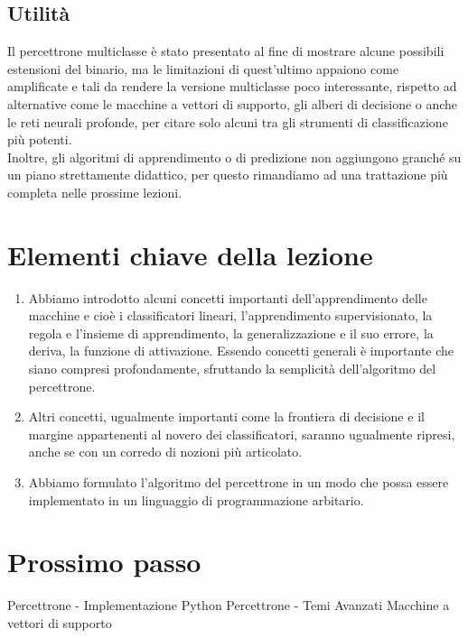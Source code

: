 \documentclass[
  letterpaper,
  DIV=11,
  numbers=noendperiod]{scrreprt}
\providecommand{\tightlist}{%
  \setlength{\itemsep}{0pt}\setlength{\parskip}{0pt}}\usepackage{longtable,booktabs,array}
\begin{document}
\subsection{Utilità}\label{utilituxe0}

Il percettrone multiclasse è stato presentato al fine di mostrare alcune
possibili estensioni del binario, ma le limitazioni di quest'ultimo
appaiono come amplificate e tali da rendere la versione multiclasse poco
interessante, rispetto ad alternative come le macchine a vettori di
supporto, gli alberi di decisione o anche le reti neurali profonde, per
citare solo alcuni tra gli strumenti di classificazione più potenti.\\
Inoltre, gli algoritmi di apprendimento o di predizione non aggiungono
granché su un piano strettamente didattico, per questo rimandiamo ad una
trattazione più completa nelle prossime lezioni.

\section{Elementi chiave della
lezione}\label{elementi-chiave-della-lezione}

\begin{enumerate}
\def\labelenumi{\arabic{enumi}.}
\tightlist
\item
  Abbiamo introdotto alcuni concetti importanti dell'apprendimento delle
  macchine e cioè i classificatori lineari, l'apprendimento
  supervisionato, la regola e l'insieme di apprendimento, la
  generalizzazione e il suo errore, la deriva, la funzione di
  attivazione. Essendo concetti generali è importante che siano compresi
  profondamente, sfruttando la semplicità dell'algoritmo del
  percettrone.
\item
  Altri concetti, ugualmente importanti come la frontiera di decisione e
  il margine appartenenti al novero dei classificatori, saranno
  ugualmente ripresi, anche se con un corredo di nozioni più articolato.
\item
  Abbiamo formulato l'algoritmo del percettrone in un modo che possa
  essere implementato in un linguaggio di programmazione arbitario.
\end{enumerate}

\section{Prossimo passo}\label{prossimo-passo}

Percettrone - Implementazione Python Percettrone - Temi Avanzati
Macchine a vettori di supporto
\end{document}
